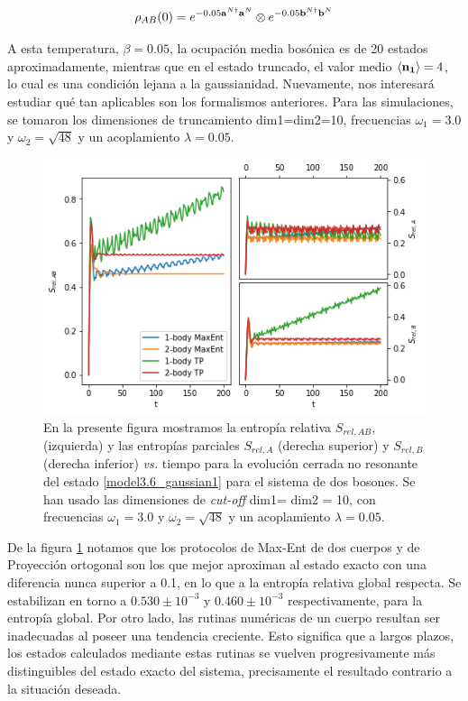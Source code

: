 \documentclass{report} %
\numberwithin{equation}{section}
\begin{document}
\begin{equation}
\rho_{AB}(0) = e^{-0.05{\bf a}^{N\dagger} {\bf a}^{N}} \otimes e^{-0.05{\bf b}^{N\dagger} {\bf b}^{N}}
\label{model3.6_gaussian1}
\end{equation}

A esta temperatura, $\beta=0.05$, la ocupación media bosónica es de 20 estados aproximadamente, mientras que en el estado truncado, el valor medio $\langle{\bf n_1} \rangle= 4$, lo cual es una condición lejana a la gaussianidad. Nuevamente, nos interesará estudiar qué tan aplicables son los formalismos anteriores. Para las simulaciones, se tomaron los dimensiones de truncamiento dim1=dim2=10, frecuencias $\omega_1 = 3.0$ y $\omega_2 = \sqrt{48}$ y un acoplamiento $\lambda = 0.05$.

\begin{figure}
    \centering
    \includegraphics[scale=0.65]{figs/section3_4/section5_bxb-closed-nonres/rel_entropy_closed_nonres_g.png}
    \caption{En la presente figura mostramos la entropía relativa $S_{rel,AB}$, (izquierda) y las entropías parciales $S_{rel,A}$ (derecha superior) y $S_{rel,B}$ (derecha inferior) \textit{vs.} tiempo para la evolución cerrada no resonante del estado \eqref{model3.6_gaussian1} para el sistema de dos bosones. Se han usado las dimensiones de \textit{cut-off} dim1= dim2 = 10, con frecuencias $\omega_1 = 3.0$ y $\omega_2 =\sqrt{48}$ y un acoplamiento $\lambda = 0.05$.}
    \label{rel_entropy_closed_nonres.png}
\end{figure}

De la figura \ref{rel_entropy_closed_nonres.png} notamos que los protocolos de Max-Ent de dos cuerpos y de Proyección ortogonal son los que mejor aproximan al estado exacto con una diferencia nunca superior a 0.1, en lo que a la entropía relativa global respecta. Se estabilizan en torno a $0.530 \pm 10^{-3}$ y $0.460 \pm 10^{-3}$ respectivamente, para la entropía global. Por otro lado, las rutinas numéricas de un cuerpo resultan ser inadecuadas al poseer una tendencia creciente. Esto significa que a largos plazos, los estados calculados mediante estas rutinas se vuelven progresivamente más distinguibles del estado exacto del sistema, precisamente el resultado contrario a la situación deseada. \newline 
\end{document}
